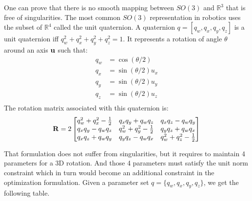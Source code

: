 One can prove that there is no smooth mapping between $SO(3)$ and $\mathbb{R}^3$ that is free of singularities.
The most common $SO(3)$ representation in robotics uses the subset of $\mathbb{R}^4$ called the unit quaternion.
A quaternion $q = [q_w, q_x, q_y, q_z]$ is a unit quaternion iff $q_w^2+q_x^2+q_y^2+q_z^2 = 1$.
It represents a rotation of angle $\theta$ around an axis ${\bf u}$ such that:
\begin{align}
  q_w &= \cos(\theta/2) \\
  q_x &= \sin(\theta/2)u_x \\
  q_y &= \sin(\theta/2)u_y \\
  q_z &= \sin(\theta/2)u_z \\
\end{align}
The rotation matrix associated with this quaternion is:
\begin{equation}
  {\bf R} = 2 \begin{bmatrix}
    q_w^2 +q_x^2-\frac{1}{2} & q_x q_y + q_w q_z & q_x q_z - q_w q_y \\
    q_x q_y - q_w q_z & q_w^2 +q_y^2-\frac{1}{2} & q_y q_z + q_w q_x \\
    q_x q_z + q_w q_y & q_y q_z - q_w q_x & q_w^2 +q_z^2-\frac{1}{2} \\
  \end{bmatrix}
\end{equation}

That formulation does not suffer from singularities, but it requires to maintain 4 parameters for a 3D rotation. And those 4 parameters must satisfy the unit norm constraint which in turn would become an additional constraint in the optimization formulation.
Given a parameter set $q = \{ q_w, q_x, q_y, q_z\}$, we get the following table.

